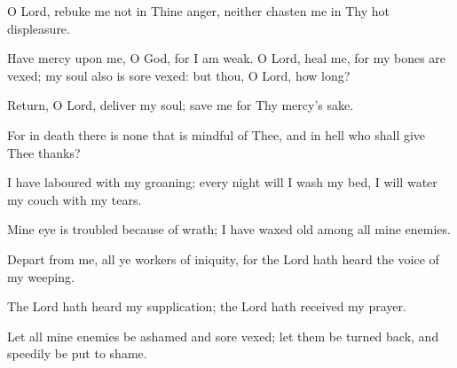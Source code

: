 O Lord, rebuke me not in Thine anger, neither chasten me in Thy hot displeasure.

Have mercy upon me, O God, for I am weak. O Lord, heal me, for my bones are vexed; my soul also is sore vexed: but thou, O Lord, how long?

Return, O Lord, deliver my soul; save me for Thy mercy's sake.

For in death there is none that is mindful of Thee, and in hell who shall give Thee thanks?

I have laboured with my groaning; every night will I wash my bed, I will water my couch with my tears.

Mine eye is troubled because of wrath; I have waxed old among all mine enemies.

Depart from me, all ye workers of iniquity, for the Lord hath heard the voice of my weeping.

The Lord hath heard my supplication; the Lord hath received my prayer.

Let all mine enemies be ashamed and sore vexed; let them be turned back, and speedily be put to shame.
